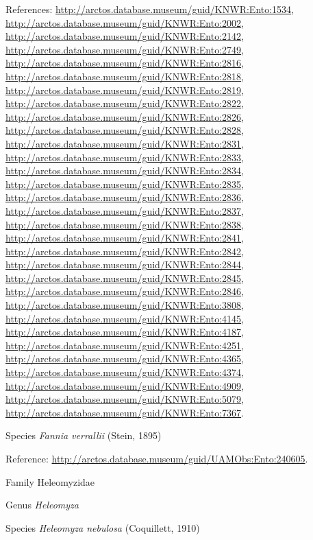 \documentclass[9pt, article]{memoir}
\begin{document}
\begin{multicols}{2}
References: 
\url{http://arctos.database.museum/guid/KNWR:Ento:1534}, 
\url{http://arctos.database.museum/guid/KNWR:Ento:2002}, 
\url{http://arctos.database.museum/guid/KNWR:Ento:2142}, 
\url{http://arctos.database.museum/guid/KNWR:Ento:2749}, 
\url{http://arctos.database.museum/guid/KNWR:Ento:2816}, 
\url{http://arctos.database.museum/guid/KNWR:Ento:2818}, 
\url{http://arctos.database.museum/guid/KNWR:Ento:2819}, 
\url{http://arctos.database.museum/guid/KNWR:Ento:2822}, 
\url{http://arctos.database.museum/guid/KNWR:Ento:2826}, 
\url{http://arctos.database.museum/guid/KNWR:Ento:2828}, 
\url{http://arctos.database.museum/guid/KNWR:Ento:2831}, 
\url{http://arctos.database.museum/guid/KNWR:Ento:2833}, 
\url{http://arctos.database.museum/guid/KNWR:Ento:2834}, 
\url{http://arctos.database.museum/guid/KNWR:Ento:2835}, 
\url{http://arctos.database.museum/guid/KNWR:Ento:2836}, 
\url{http://arctos.database.museum/guid/KNWR:Ento:2837}, 
\url{http://arctos.database.museum/guid/KNWR:Ento:2838}, 
\url{http://arctos.database.museum/guid/KNWR:Ento:2841}, 
\url{http://arctos.database.museum/guid/KNWR:Ento:2842}, 
\url{http://arctos.database.museum/guid/KNWR:Ento:2844}, 
\url{http://arctos.database.museum/guid/KNWR:Ento:2845}, 
\url{http://arctos.database.museum/guid/KNWR:Ento:2846}, 
\url{http://arctos.database.museum/guid/KNWR:Ento:3808}, 
\url{http://arctos.database.museum/guid/KNWR:Ento:4145}, 
\url{http://arctos.database.museum/guid/KNWR:Ento:4187}, 
\url{http://arctos.database.museum/guid/KNWR:Ento:4251}, 
\url{http://arctos.database.museum/guid/KNWR:Ento:4365}, 
\url{http://arctos.database.museum/guid/KNWR:Ento:4374}, 
\url{http://arctos.database.museum/guid/KNWR:Ento:4909}, 
\url{http://arctos.database.museum/guid/KNWR:Ento:5079}, 
\url{http://arctos.database.museum/guid/KNWR:Ento:7367}.

\vspace{6pt}\noindent\hspace{36pt}Species \textit{Fannia verrallii} (Stein, 1895)


Reference: 
\url{http://arctos.database.museum/guid/UAMObs:Ento:240605}.

\vspace{6pt}\noindent\hspace{24pt}Family Heleomyzidae


\vspace{6pt}\noindent\hspace{30pt}Genus \textit{Heleomyza}


\vspace{6pt}\noindent\hspace{36pt}Species \textit{Heleomyza nebulosa} (Coquillett, 1910)



\end{multicols}
\end{document}
